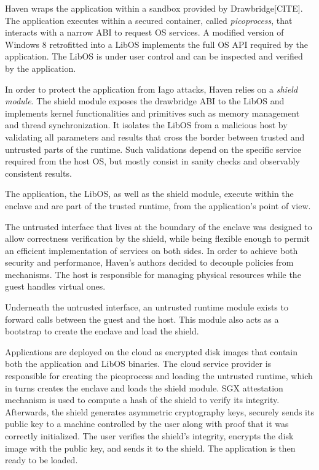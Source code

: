 Haven wraps the application within a sandbox provided by Drawbridge[CITE].
The application executes within a secured container, called \emph{picoprocess}, that interacts with a narrow ABI to request OS services.
A modified version of Windows 8 retrofitted into a LibOS implements the full OS API required by the application.
The LibOS is under user control and can be inspected and verified by the application.

In order to protect the application from Iago attacks, Haven relies on a \emph{shield module}.
The shield module exposes the drawbridge ABI to the LibOS and implements kernel functionalities and primitives such as memory management and thread synchronization.
It isolates the LibOS from a malicious host by validating all parameters and results that cross the border between trusted and untrusted parts of the runtime.
Such validations depend on the specific service required from the host OS, but mostly consist in sanity checks and observably consistent results.

The application, the LibOS, as well as the shield module, execute within the enclave and are part of the trusted runtime, from the application's point of view.

The untrusted interface that lives at the boundary of the enclave was designed to allow correctness verification by the shield, while being flexible enough to permit an efficient implementation of services on both sides.
In order to achieve both security and performance, Haven's authors decided to decouple policies from mechanisms.
The host is responsible for managing physical resources while the guest handles virtual ones.

Underneath the untrusted interface, an untrusted runtime module exists to forward calls between the guest and the host.
This module also acts as a bootstrap to create the enclave and load the shield.

Applications are deployed on the cloud as encrypted disk images that contain both the application and LibOS binaries.
The cloud service provider is responsible for creating the picoprocess and loading the untrusted runtime, which in turns creates the enclave and loads the shield module.
SGX attestation mechanism is used to compute a hash of the shield to verify its integrity.
Afterwards, the shield generates asymmetric cryptography keys, securely sends its public key to a machine controlled by the user along with proof that it was correctly initialized.
The user verifies the shield's integrity, encrypts the disk image with the public key, and sends it to the shield.
The application is then ready to be loaded.

